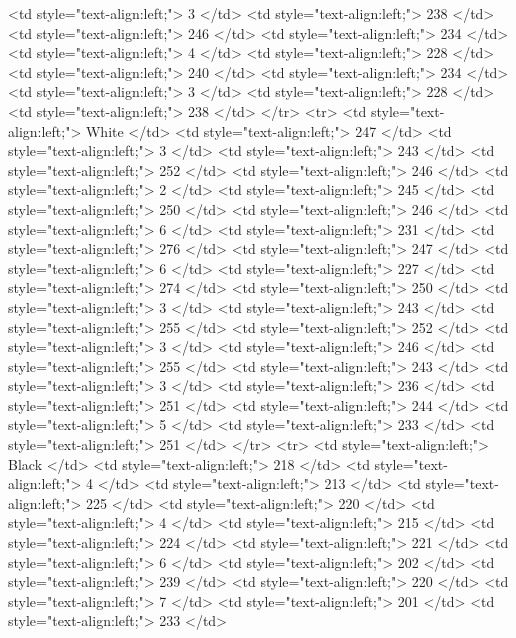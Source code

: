    <td style="text-align:left;"> 3 </td>
   <td style="text-align:left;"> 238 </td>
   <td style="text-align:left;"> 246 </td>
   <td style="text-align:left;"> 234 </td>
   <td style="text-align:left;"> 4 </td>
   <td style="text-align:left;"> 228 </td>
   <td style="text-align:left;"> 240 </td>
   <td style="text-align:left;"> 234 </td>
   <td style="text-align:left;"> 3 </td>
   <td style="text-align:left;"> 228 </td>
   <td style="text-align:left;"> 238 </td>
  </tr>
  <tr>
   <td style="text-align:left;"> White </td>
   <td style="text-align:left;"> 247 </td>
   <td style="text-align:left;"> 3 </td>
   <td style="text-align:left;"> 243 </td>
   <td style="text-align:left;"> 252 </td>
   <td style="text-align:left;"> 246 </td>
   <td style="text-align:left;"> 2 </td>
   <td style="text-align:left;"> 245 </td>
   <td style="text-align:left;"> 250 </td>
   <td style="text-align:left;"> 246 </td>
   <td style="text-align:left;"> 6 </td>
   <td style="text-align:left;"> 231 </td>
   <td style="text-align:left;"> 276 </td>
   <td style="text-align:left;"> 247 </td>
   <td style="text-align:left;"> 6 </td>
   <td style="text-align:left;"> 227 </td>
   <td style="text-align:left;"> 274 </td>
   <td style="text-align:left;"> 250 </td>
   <td style="text-align:left;"> 3 </td>
   <td style="text-align:left;"> 243 </td>
   <td style="text-align:left;"> 255 </td>
   <td style="text-align:left;"> 252 </td>
   <td style="text-align:left;"> 3 </td>
   <td style="text-align:left;"> 246 </td>
   <td style="text-align:left;"> 255 </td>
   <td style="text-align:left;"> 243 </td>
   <td style="text-align:left;"> 3 </td>
   <td style="text-align:left;"> 236 </td>
   <td style="text-align:left;"> 251 </td>
   <td style="text-align:left;"> 244 </td>
   <td style="text-align:left;"> 5 </td>
   <td style="text-align:left;"> 233 </td>
   <td style="text-align:left;"> 251 </td>
  </tr>
  <tr>
   <td style="text-align:left;"> Black </td>
   <td style="text-align:left;"> 218 </td>
   <td style="text-align:left;"> 4 </td>
   <td style="text-align:left;"> 213 </td>
   <td style="text-align:left;"> 225 </td>
   <td style="text-align:left;"> 220 </td>
   <td style="text-align:left;"> 4 </td>
   <td style="text-align:left;"> 215 </td>
   <td style="text-align:left;"> 224 </td>
   <td style="text-align:left;"> 221 </td>
   <td style="text-align:left;"> 6 </td>
   <td style="text-align:left;"> 202 </td>
   <td style="text-align:left;"> 239 </td>
   <td style="text-align:left;"> 220 </td>
   <td style="text-align:left;"> 7 </td>
   <td style="text-align:left;"> 201 </td>
   <td style="text-align:left;"> 233 </td>
